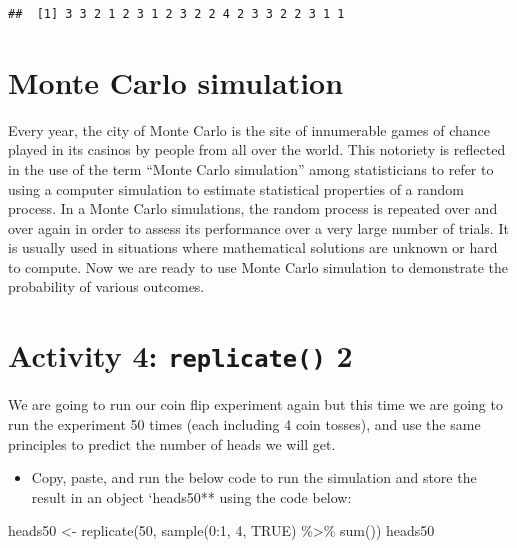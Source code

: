 \documentclass[
  oneside]{book}
\newenvironment{Shaded}{\begin{snugshade}}{\end{snugshade}}
\newcommand{\ConstantTok}[1]{\textcolor[rgb]{0.00,0.00,0.00}{#1}}
\newcommand{\DecValTok}[1]{\textcolor[rgb]{0.00,0.00,0.81}{#1}}
\newcommand{\FunctionTok}[1]{\textcolor[rgb]{0.00,0.00,0.00}{#1}}
\newcommand{\NormalTok}[1]{#1}
\newcommand{\OtherTok}[1]{\textcolor[rgb]{0.56,0.35,0.01}{#1}}
\newcommand{\SpecialCharTok}[1]{\textcolor[rgb]{0.00,0.00,0.00}{#1}}
\providecommand{\tightlist}{%
  \setlength{\itemsep}{0pt}\setlength{\parskip}{0pt}}
\begin{document}
\begin{verbatim}
##  [1] 3 3 2 1 2 3 1 2 3 2 2 4 2 3 3 2 2 3 1 1
\end{verbatim}

\hypertarget{monte-carlo-simulation}{%
\section{Monte Carlo simulation}\label{monte-carlo-simulation}}

Every year, the city of Monte Carlo is the site of innumerable games of chance played in its casinos by people from all over the world. This notoriety is reflected in the use of the term ``Monte Carlo simulation'' among statisticians to refer to using a computer simulation to estimate statistical properties of a random process. In a Monte Carlo simulations, the random process is repeated over and over again in order to assess its performance over a very large number of trials. It is usually used in situations where mathematical solutions are unknown or hard to compute. Now we are ready to use Monte Carlo simulation to demonstrate the probability of various outcomes.

\hypertarget{activity-4-replicate-2}{%
\section{\texorpdfstring{Activity 4: \texttt{replicate()} 2}{Activity 4: replicate() 2}}\label{activity-4-replicate-2}}

We are going to run our coin flip experiment again but this time we are going to run the experiment 50 times (each including 4 coin tosses), and use the same principles to predict the number of heads we will get.

\begin{itemize}
\tightlist
\item
  Copy, paste, and run the below code to run the simulation and store the result in an object `heads50** using the code below:
\end{itemize}

\begin{Shaded}
\begin{Highlighting}[]
\NormalTok{heads50 }\OtherTok{\textless{}{-}} \FunctionTok{replicate}\NormalTok{(}\DecValTok{50}\NormalTok{, }\FunctionTok{sample}\NormalTok{(}\DecValTok{0}\SpecialCharTok{:}\DecValTok{1}\NormalTok{, }\DecValTok{4}\NormalTok{, }\ConstantTok{TRUE}\NormalTok{) }\SpecialCharTok{\%\textgreater{}\%} \FunctionTok{sum}\NormalTok{())   }
\NormalTok{heads50}
\end{Highlighting}
\end{Shaded}
\end{document}
